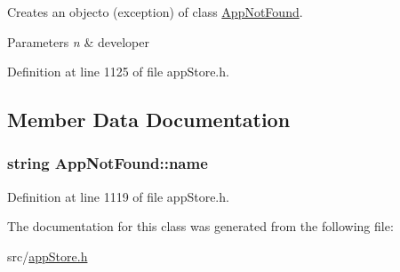 Creates an objecto (exception) of class \hyperlink{class_app_not_found}{App\-Not\-Found}. 


\begin{DoxyParams}{Parameters}
{\em n} & developer \\
\hline
\end{DoxyParams}


Definition at line 1125 of file app\-Store.\-h.



\subsection{Member Data Documentation}
\hypertarget{class_app_not_found_aa6c5acb8dbaf037e57aed9f0e0870af5}{
\subsubsection[{name}]{\setlength{\rightskip}{0pt plus 5cm}string App\-Not\-Found\-::name}}\label{class_app_not_found_aa6c5acb8dbaf037e57aed9f0e0870af5}


Definition at line 1119 of file app\-Store.\-h.



The documentation for this class was generated from the following file\-:\begin{DoxyCompactItemize}
\item 
src/\hyperlink{app_store_8h}{app\-Store.\-h}\end{DoxyCompactItemize}
